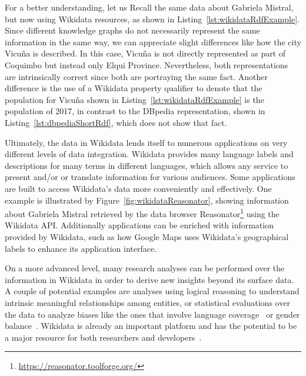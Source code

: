 For a better understanding, let us Recall the same data about Gabriela Mistral, but now using 
Wikidata resources, as shown in Listing~\ref{lst:wikidataRdfExample}. Since different knowledge 
graphs do not necessarily represent the same information in the same way, we can appreciate slight 
differences like how the city Vicuña is described. In this case, Vicuña is not directly represented 
as part of Coquimbo but instead only Elqui Province. Nevertheless, both representations are 
intrinsically correct since both are portraying the same fact. Another difference is the use of 
a Wikidata property qualifier to denote that the population for Vicuña shown in 
Listing~\ref{lst:wikidataRdfExample} is the population of 2017, in contrast to the DBpedia 
representation, shown in Listing~\ref{lst:dbpediaShortRdf}, which does not show that fact.

Ultimately, the data in Wikidata lends itself to numerous applications on very different levels 
of data integration. Wikidata provides many language labels and descriptions for many terms in 
different languages, which allows any service to present and/or or translate information for 
various audiences. Some applications are built to access Wikidata’s data more conveniently and 
effectively. One example is illustrated by Figure~\ref{fig:wikidataReasonator}, showing 
information about Gabriela Mistral retrieved by the data browser 
Reasonator\footnote{\url{https://reasonator.toolforge.org/}} using the Wikidata API. Additionally 
applications can be enriched with information provided by Wikidata, such as how Google Maps 
uses Wikidata’s geographical labels to enhance its application interface. 

On a more advanced level, many research analyses can be performed over the information in 
Wikidata in order to derive new insights beyond its surface data. A couple of potential examples 
are analyses using logical reasoning to understand intrinsic meaningful relationships among 
entities, or statistical evaluations over the data to analyze biases like the ones that involve 
language coverage~\cite{key:wikidataHale13} or gender balance~\cite{key:socialWikidataWagner16}. 
Wikidata is already an important platform and has the potential to be a major resource for both 
researchers and developers~\cite{wikidata:GeneWikiInitiative, wikidata:RiseWikidataVrandecic6682924}.
